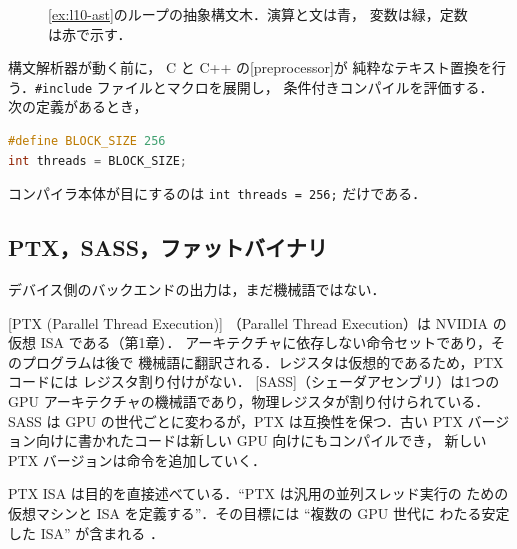 \documentclass[../main.tex]{subfiles}
\begin{document}
\begin{figure}[tb]
  \centering
  
  \caption{\cref{ex:l10-ast}のループの抽象構文木．演算と文は青，
    変数は緑，定数は赤で示す．}
  \label{fig:l10-ast}
\end{figure}

構文解析器が動く前に，
C と C++ の[preprocessor]が
純粋なテキスト置換を行う．\texttt{\#include} ファイルとマクロを展開し，
条件付きコンパイルを評価する．
次の定義があるとき，
\begin{lstlisting}[language=C++, numbers=none]
#define BLOCK_SIZE 256
int threads = BLOCK_SIZE;
\end{lstlisting}
コンパイラ本体が目にするのは \texttt{int threads = 256;} だけである．

\subsection{PTX，SASS，ファットバイナリ}

デバイス側のバックエンドの出力は，まだ機械語ではない．

\begin{definition}
  [PTX (Parallel Thread Execution)]
  （Parallel Thread Execution）は NVIDIA の仮想 ISA である（第1章）．
  アーキテクチャに依存しない命令セットであり，そのプログラムは後で
  機械語に翻訳される．レジスタは仮想的であるため，PTX コードには
  レジスタ割り付けがない．
  [SASS]（シェーダアセンブリ）は1つの GPU
  アーキテクチャの機械語であり，物理レジスタが割り付けられている．
  SASS は GPU の世代ごとに変わるが，PTX は互換性を保つ．古い PTX
  バージョン向けに書かれたコードは新しい GPU 向けにもコンパイルでき，
  新しい PTX バージョンは命令を追加していく．
\end{definition}

PTX ISA は目的を直接述べている．\enquote{PTX は汎用の並列スレッド実行の
ための仮想マシンと ISA を定義する}．その目標には \enquote{複数の GPU 世代に
わたる安定した ISA} が含まれる \cite[§1.1--1.2]{nvidia2026ptx}．
\end{document}
